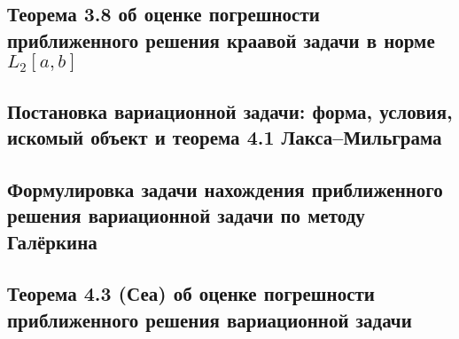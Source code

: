 \documentclass[a4paper,14pt]{article} %
\begin{document}
\subsection{Теорема 3.8 об оценке погрешности приближенного решения краавой задачи в норме $L_2[a,b]$}

\subsection{Постановка вариационной задачи: форма, условия, искомый объект и теорема 4.1 Лакса--Мильграма}

\subsection{Формулировка задачи нахождения приближенного решения вариационной задачи по методу Галёркина}

\subsection{Теорема 4.3 (Сеа) об оценке погрешности приближенного решения вариационной задачи}
\end{document}
